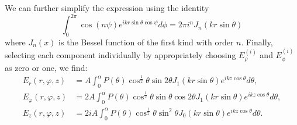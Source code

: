 \documentclass[12pt,a4paper]{article}
\begin{document}
We can further simplify the expression using the identity
\begin{displaymath}
	\int_{0}^{2\pi}\cos{\left(n\psi\right)}e^{ikr\sin{\theta}\cos{\psi}}d\phi = 2\pi i^{n}J_{n}\!\left(kr\sin{\theta}\right)
\end{displaymath}
where \(J_{n}\!\left(x\right)\) is the Bessel function of the first kind with order \(n\). Finally, selecting each component individually by appropriately choosing \(E_{\rho}^{(i)}\) and \(E_{\phi}^{(i)}\) as zero or one, we find:
\begin{align}
	\label{eq:er}
	E_{r}\!\left(r,\varphi,z\right) &= A\int_{0}^{\alpha} P\!\left(\theta\right)\cos^{\frac{1}{2}}\!{\theta}\sin{2\theta}J_{1}\!\left(kr\sin{\theta}\right)e^{ikz\cos{\theta}}d\theta, \\
	\label{eq:ephi}
	E_{\varphi}\!\left(r,\varphi,z\right) &= 2A\int_{0}^{\alpha} P\!\left(\theta\right)\cos^{\frac{1}{2}}\!{\theta}\sin{\theta}\cos{2\theta}J_{1}\!\left(kr\sin{\theta}\right)e^{ikz\cos{\theta}}d\theta, \\
	\label{eq:ez}
		E_{z}\!\left(r,\varphi,z\right) &= 2iA\int_{0}^{\alpha} P\!\left(\theta\right)\cos^{\frac{1}{2}}\!{\theta}\sin^{2}{\theta}J_{0}\!\left(kr\sin{\theta}\right)e^{ikz\cos{\theta}}d\theta.
\end{align}
\end{document}
